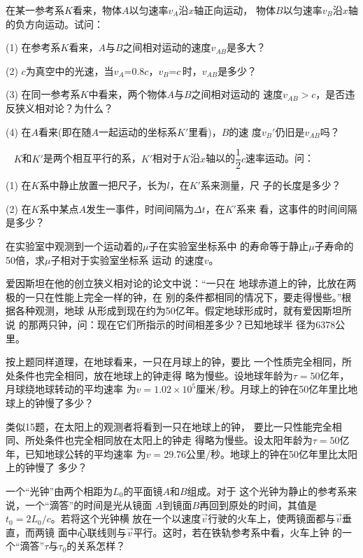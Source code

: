 \begin{exercises}
\exercise 在某一参考系$K$看来，物体$A$以匀速率$v_A$沿$x$轴正向运动，
物体$B$以匀速率$v_B$沿$x$轴的负方向运动。试问：

(1) 在参考系\*$K$\*看来，\!$A$\*与\*$B$\*之间相对运动的速度\*$v_{A\!B}$\*是多大？

(2) $c$\*为真空中的光速，当\*$ v _ { A }$=0.8$ c $，\!$ v _ { B }$=$ c  $\,时，\!$v_{A\!B}$\*是多少？

(3) 在同一参考系$K$中看来，两个物体$A$与$B$之间相对运动的
速度$ v _ { A B } > c  $，是否违反狭义相对论？为什么？

(4) 在$A$看来(即在随$A$一起运动的坐标系$K'$里看)，$B$的速
度$ v _ B ' $仍旧是$v_{AB}$吗？

\exercise~ $K$和$K'$是两个相互平行的系，$K'$相对于$K$沿$x$轴以的$\dfrac { 1 } { 2 } c $速率运动。问：

(1) 在$K$系中静止放置一把尺子，长为$l$，在$K'$系来测量，尺
子的长度是多少？

(2) 在$K$系中某点$A$发生一事件，时间间隔为$\Delta t$，在$K'$系来
看，这事件的时间间隔是多少？

\exercise 在实验室中观测到一个运动着的$\mu$子在实验室坐标系中
的寿命等于静止$\mu$子寿命的50倍，求$\mu$子相对于实验室坐标系
运动
的速度$v$。

\clearpage
\exercise 爱因斯坦在他的创立狭义相对论的论文中说：“一只在
地球赤道上的钟，比放在两极的一只在性能上完全一样的钟，在
别的条件都相同的情况下，要走得慢些。”根据各种观测，地球
从形成到现在约为50亿年。假定地球形成时，就有爱因斯坦所说
的那两只钟，问：现在它们所指示的时间相差多少？已知地球半
径为6378公里。\vspace{-0.14em}

\exercise 按上题同样道理，在地球看来，一只在月球上的钟，要比
一个性质完全相同，所处条件也完全相同，放在地球上的钟走得
略为慢些。设地球年龄为$ \tau = 5 0  $亿年，月球绕地球转动的平均速率
为$ v = 1 . 0 2 \times 1 0 ^ { 5 }  $厘米/秒。月球上的钟在50亿年里比地球上的钟慢了多少？\vspace{-0.14em}

\exercise 类似15题，在太阳上的观测者将看到一只在地球上的钟，
要比一只性能完全相同、所处条件也完全相同放在太阳上的钟走
得略为慢些。设太阳年龄为$ \tau = 5 0  $亿年，已知地球公转的平均速率
为$ v = 2 9 . 7 6  $公里/秒。地球上的钟在50亿年里比太阳上的钟慢了
多少？\vspace{-0.14em}

\exercise 一个“光钟”由两个相距为$ L _ { 0 }  $的平面镜$A$和$B$组成。对于
这个光钟为静止的参考系来说，一个“滴答”的时间是光从镜面
$A$到镜面$B$再回到原处的时间，其值是$ t _ { 0 } = 2 L _ { 0 }  /c$。若将这个光钟横
放在一个以速度$\vec{v}$行驶的火车上，使两镜面都与$\vec{v}$垂直，而两镜
面中心联线则与$\vec{v}$平行。这时，若在铁轨参考系中看，火车上钟
的一个“滴答”$\tau$与$\tau _ 0$的关系怎样？\vspace{-0.14em}


\end{exercises}
